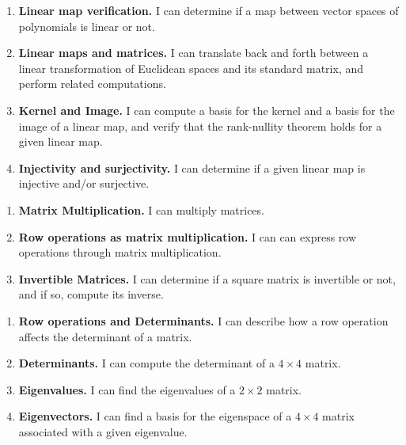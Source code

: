 \documentclass{article}
\newcommand{\module}{?}
\newcommand{\setModule}[1]{\renewcommand{\module}{#1}}
\newenvironment{moduleStandards}{
  \begin{enumerate}[\bf\(\Box\) \(\Box\) \module{}1.]
  \setlength{\itemsep}{-0.02in}
}{
  \end{enumerate}
}
\newcommand{\standard}[3]{
  \item \textbf{#1.}
        I can#3
}
\begin{document}
\setModule{AT}
\begin{moduleStandards}
  \standard{Linear map verification}{LinVer}{
    determine if a map between vector spaces of polynomials is linear or not.
  }
  \standard{Linear maps and matrices}{LinMat}{
    translate back and forth between a
    linear transformation of Euclidean spaces and its standard matrix, and
    perform related computations.
  }
  \standard{Kernel and Image}{KerImg}{
    compute a basis for the kernel and a basis for the image of a linear map, and verify that the rank-nullity theorem holds for a given linear map.
  }
  \standard{Injectivity and surjectivity}{InjSrj}{
    determine if a given linear map is injective and/or surjective.
  }
\end{moduleStandards}
\setModule{MX}
\begin{moduleStandards}
  \standard{Matrix Multiplication}{MatMlt}{
    multiply matrices.
  }
  \standard{Row operations as matrix multiplication}{RowMult}{
    can express row operations through matrix multiplication.
  }
  \standard{Invertible Matrices}{InvVer}{
    determine if a square matrix is invertible or not, and if so, compute its inverse.
  }
\end{moduleStandards}
\setModule{GT}
\begin{moduleStandards}
  \standard{Row operations and Determinants}{RowOp}{
    describe how a row operation affects the determinant of a matrix. }
  \standard{Determinants}{Det}{
    compute the determinant of a \(4\times 4\) matrix.
  }
  \standard{Eigenvalues}{EigVal}{
    find the eigenvalues of a \(2\times 2\) matrix.
  }
  \standard{Eigenvectors}{EigVec}{
    find a basis for the eigenspace of a \(4\times 4\)  
    matrix associated with a given eigenvalue.
  }
\end{moduleStandards}
\end{document}
